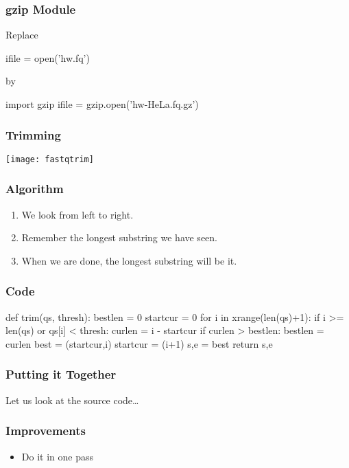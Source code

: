 \begin{frame}[fragile]
\frametitle{gzip Module}


Replace

\begin{python}
ifile = open('hw.fq')
\end{python}

by

\begin{python}
import gzip
ifile = gzip.open('hw-HeLa.fq.gz')
\end{python}
\end{frame}


\begin{frame}[fragile]
\frametitle{Trimming}

\centering
\texttt{[image: fastqtrim]}

\end{frame}

\begin{frame}[fragile]
\frametitle{Algorithm}

\begin{enumerate}
\item We look from left to right.
\item Remember the longest substring we have seen.
\item When we are done, the longest substring will be it.
\end{enumerate}

\end{frame}

\begin{frame}[fragile]
\frametitle{Code}
\begin{python}
def trim(qs, thresh):
    bestlen = 0
    startcur = 0
    for i in xrange(len(qs)+1):
        if i >= len(qs) or qs[i] < thresh:
            curlen = i - startcur
            if curlen > bestlen:
                bestlen = curlen
                best = (startcur,i)
            startcur = (i+1)
    s,e = best
    return s,e
\end{python}
\end{frame}

\begin{frame}[fragile]
\frametitle{Putting it Together}

Let us look at the source code\ldots
\end{frame}

\begin{frame}[fragile]
\frametitle{Improvements}
\begin{itemize}
\item Do it in one pass
\end{itemize}
\end{frame}


